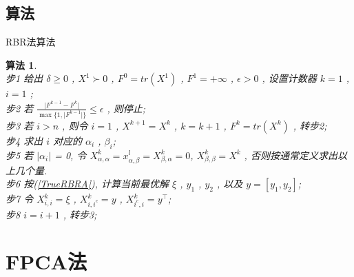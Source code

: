 \documentclass[slidestop, compress, mathserif, UTF8]{beamer}
\newtheorem{algo}{\bf \textcolor[rgb]{0.8,0,0}{算法}}
\numberwithin{equation}{section}                                        %
\begin{document}
        \subsection{算法}
            \begin{frame}[t]{RBR法算法}
                \begin{algo}
                    \small\quad\\
                    步1 \quad 给出 $\delta \ge 0$ , $X^1 \succ 0$ , $F^0 = tr(X^1)$ , $F^1 = + \infty$ , $\epsilon > 0$ , 设置计数器 $k = 1$ , $i = 1$ ;\\
                    步2 \quad 若 $\frac{\lvert{F^{k - 1}-F^k}\rvert}{\max\{1,\lvert{F^{k - 1}}\rvert\}}\leq\epsilon$ , 则停止;\\
                    步3 \quad 若 $i>n$ , 则令 $i=1$ , $X^{k + 1}=X^k$ , $k=k + 1$ , $F^k = tr(X^k)$ , 转步2;\\
                    步4 \quad 求出 $i$ 对应的 $\alpha_i$ , $\beta_i$;\\
                    步5 \quad 若 $\vert{\alpha_i}\vert$ = 0, 令 $X^k_{\alpha, \alpha} = x^l_{\alpha, \beta} = X^k_{\beta, \alpha} = 0$, $X^k_{\beta, \beta} = X^k$ , 否则按通常定义求出以上几个量.\\
                    步6 \quad 按(\ref{TrueRBRA}), 计算当前最优解 $\xi$ , $y_1$ , $y_2$ , 以及 $y = [y_1, y_2]$;\\
                    步7 \quad 令 $X^{k}_{i, i} = \xi$ , $X^{k}_{i, i^c} = y$ , $X^{k}_{i^c, i} = y^\top$;\\
                    步8 \quad $i = i + 1$ , 转步3;\normalsize
                \end{algo}
            \end{frame}
    \section{FPCA法}\label{section4}
\end{document}
